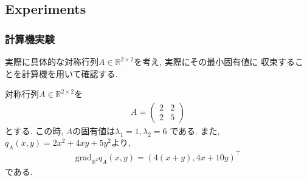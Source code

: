 \documentclass[dvipdfmx,11pt]{beamer}		%
\newcommand{\R}{\mathbb{R}}
\begin{document}
    \subsection{Experiments}
    \begin{frame}
        \frametitle{計算機実験}
        実際に具体的な対称行列$A\in\R^{2\times 2}$を考え, 実際にその最小固有値に
        収束することを計算機を用いて確認する\cite{sato}. 
        \begin{exampleblock}{}
            対称行列$A\in\R^{2\times 2}$を
            \begin{align*}
                A = \left(
                    \begin{array}{ccc}
                            2 & 2 \\
                            2 & 5 
                    \end{array}
                    \right)
            \end{align*}
            とする. この時, $A$の固有値は$\lambda_{1} = 1, \lambda_{2} = 6$
            である. また, $q_{A}(x, y) = 2x^2 + 4xy + 5y^2$より, 
            \begin{align*}
                \mathrm{grad}_{\R^2}q_A(x, y) = (4(x + y), 4x + 10y)^{\top}
            \end{align*}
            である. 
        \end{exampleblock}
    \end{frame}
\end{document}
